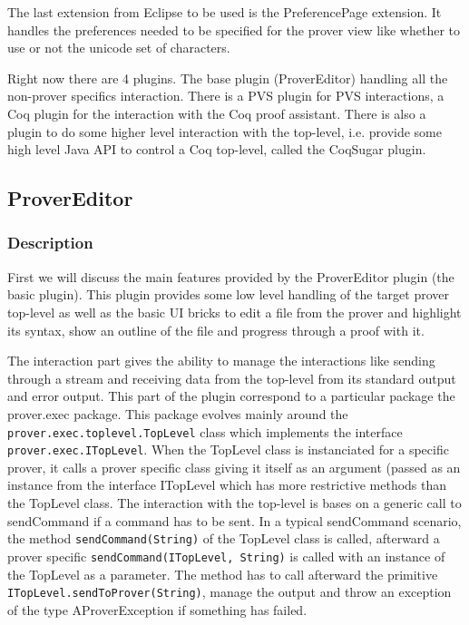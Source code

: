 \documentclass{entcs}
\begin{document}
The last extension from Eclipse to be used is the PreferencePage extension.
It handles the preferences needed to be specified for the prover view
like whether to use or not the unicode set of characters.


Right now there are 4 plugins. The base plugin (ProverEditor)
handling all the non-prover specifics interaction. There is a PVS plugin for
PVS interactions, a Coq plugin for the interaction with the Coq proof 
assistant. There is also a plugin to do some higher level interaction 
with the top-level, i.e. provide some high level Java API to control 
a Coq top-level, called the CoqSugar plugin. 
\subsection{ProverEditor}
\subsubsection{Description}
First we will discuss the main features provided by the ProverEditor plugin
(the basic plugin). This plugin provides some low level handling of the target
prover top-level as well as the basic UI bricks to edit a file from the 
prover and highlight its syntax, show an outline of the file and
progress through a proof with it.

The interaction part gives the ability to manage the interactions like sending
through a stream and receiving data from the top-level from its standard output
and error output.
This part of the plugin correspond to a particular package the 
prover.exec package.
This package evolves mainly around the \\
{\tt prover.exec.toplevel.TopLevel} class
which implements the interface {\tt prover.exec.ITopLevel}. 
When the TopLevel class
is instanciated for a specific prover, it calls a prover specific class giving 
it itself as an argument (passed as an instance from the interface
ITopLevel which has more restrictive methods than the TopLevel class.
The interaction with the top-level is bases on a generic call to sendCommand
if a command has to be sent. In a typical sendCommand scenario, the method
{\tt sendCommand(String)} of the TopLevel class is called, 
afterward a prover specific 
{\tt sendCommand(ITopLevel, String)} is called with an instance of the 
TopLevel as a parameter. The method has to call afterward the primitive
{\tt ITopLevel.sendToProver(String)}, manage the output and throw an 
exception of the type AProverException if something has failed.
\end{document}
